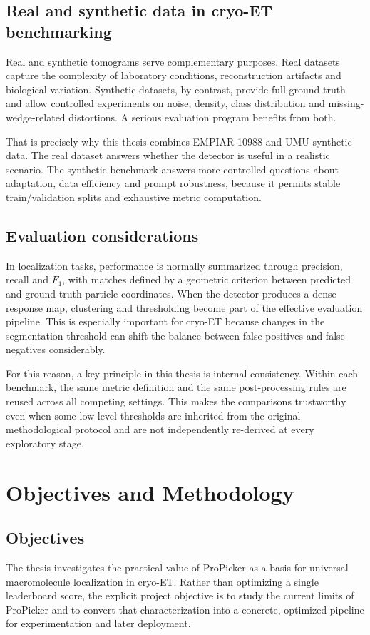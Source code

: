 \documentclass[12pt,a4paper]{report}
\begin{document}
\section{Real and synthetic data in cryo-ET benchmarking}
Real and synthetic tomograms serve complementary purposes. Real datasets capture the complexity of laboratory conditions, reconstruction artifacts and biological variation. Synthetic datasets, by contrast, provide full ground truth and allow controlled experiments on noise, density, class distribution and missing-wedge-related distortions. A serious evaluation program benefits from both.

That is precisely why this thesis combines EMPIAR-10988 and UMU synthetic data. The real dataset answers whether the detector is useful in a realistic scenario. The synthetic benchmark answers more controlled questions about adaptation, data efficiency and prompt robustness, because it permits stable train/validation splits and exhaustive metric computation.

\section{Evaluation considerations}
In localization tasks, performance is normally summarized through precision, recall and \(F_1\), with matches defined by a geometric criterion between predicted and ground-truth particle coordinates. When the detector produces a dense response map, clustering and thresholding become part of the effective evaluation pipeline. This is especially important for cryo-ET because changes in the segmentation threshold can shift the balance between false positives and false negatives considerably.

For this reason, a key principle in this thesis is internal consistency. Within each benchmark, the same metric definition and the same post-processing rules are reused across all competing settings. This makes the comparisons trustworthy even when some low-level thresholds are inherited from the original methodological protocol and are not independently re-derived at every exploratory stage.

\chapter{Objectives and Methodology}

\section{Objectives}
The thesis investigates the practical value of ProPicker as a basis for universal macromolecule localization in cryo-ET. Rather than optimizing a single leaderboard score, the explicit project objective is to study the current limits of ProPicker and to convert that characterization into a concrete, optimized pipeline for experimentation and later deployment.
\end{document}
